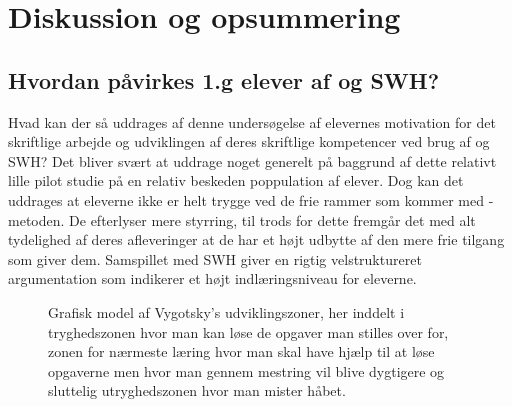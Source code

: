 \chapter{Diskussion og opsummering}
\label{Ch:5}

\section{Hvordan påvirkes 1.g elever af \ib{} og SWH?}
\label{sec:ibseswh}
Hvad kan der så uddrages af denne undersøgelse af elevernes motivation for det skriftlige arbejde og udviklingen af deres skriftlige kompetencer ved brug af \ib{} og SWH? Det bliver svært at uddrage noget generelt på baggrund af dette relativt lille pilot studie på en relativ beskeden poppulation af elever. Dog kan det uddrages at eleverne ikke er helt trygge ved de frie rammer som kommer med \ib{}-metoden. De efterlyser mere styrring, til trods for dette fremgår det med alt tydelighed af deres afleveringer at de har et højt udbytte af den mere frie tilgang som \ib{} giver dem. Samspillet med SWH giver en rigtig velstruktureret argumentation som indikerer et højt indlæringsniveau for eleverne. 

\begin{figure}[h!]
	\centering
	\usetikzlibrary{decorations.text}
	\caption{Grafisk model af Vygotsky's udviklingszoner, her inddelt i tryghedszonen hvor man kan løse de opgaver man stilles over for, zonen for nærmeste læring hvor man skal have hjælp til at løse opgaverne men hvor man gennem mestring vil blive dygtigere og sluttelig utryghedszonen hvor man mister håbet. }
	\label{fig:vyg}
\end{figure}


